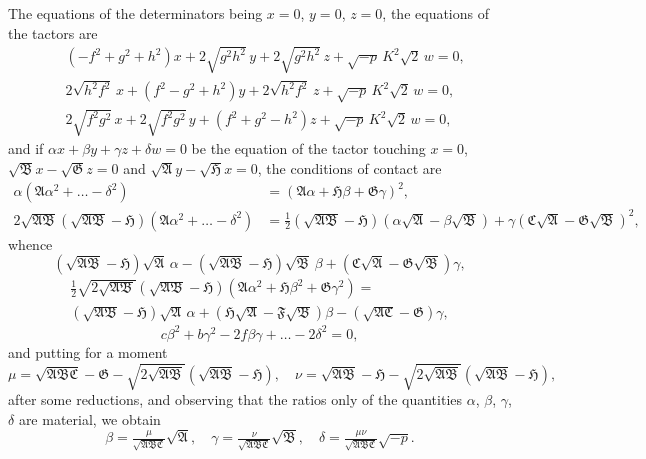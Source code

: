\documentclass[11pt,a4paper]{book}
\begin{document}
The equations of the determinators being $x=0$, $y=0$, $z=0$, the equations of the tactors are
\begin{align*}
&(-f^2+g^2+h^2)x + 2\sqrt{g^2h^2}\,y + 2\sqrt{g^2h^2}\,z + \sqrt{-p}\,K^2\sqrt{2}\,w = 0,\\
&2\sqrt{h^2f^2}\,x + (f^2-g^2+h^2)y + 2\sqrt{h^2f^2}\,z + \sqrt{-p}\,K^2\sqrt{2}\,w = 0,\\
&2\sqrt{f^2g^2}\,x + 2\sqrt{f^2g^2}\,y + (f^2+g^2-h^2)z + \sqrt{-p}\,K^2\sqrt{2}\,w = 0,
\end{align*}
and if $\alpha x+\beta y+\gamma z+\delta w=0$ be the equation of the tactor touching $x=0$, $\sqrt{\mathfrak{B}}x-\sqrt{\mathfrak{G}}z=0$ and $\sqrt{\mathfrak{A}}y-\sqrt{\mathfrak{H}}x=0$, the conditions of contact are
\begin{align*}
\alpha(\mathfrak{A}\alpha^2+\ldots-\delta^2) &= (\mathfrak{A}\alpha+\mathfrak{H}\beta+\mathfrak{G}\gamma)^2,\\
2\sqrt{\mathfrak{A}\mathfrak{B}}(\sqrt{\mathfrak{A}\mathfrak{B}}-\mathfrak{H})(\mathfrak{A}\alpha^2+\ldots-\delta^2) &= \tfrac{1}{2}(\sqrt{\mathfrak{A}\mathfrak{B}}-\mathfrak{H})(\alpha\sqrt{\mathfrak{A}}-\beta\sqrt{\mathfrak{B}})+\gamma(\mathfrak{C}\sqrt{\mathfrak{A}}-\mathfrak{G}\sqrt{\mathfrak{B}})^2,
\end{align*}
whence
\[
(\sqrt{\mathfrak{A}\mathfrak{B}}-\mathfrak{H})\sqrt{\mathfrak{A}}\,\alpha - (\sqrt{\mathfrak{A}\mathfrak{B}}-\mathfrak{H})\sqrt{\mathfrak{B}}\,\beta + (\mathfrak{C}\sqrt{\mathfrak{A}}-\mathfrak{G}\sqrt{\mathfrak{B}})\gamma,
\]
\begin{multline*}
\tfrac{1}{2}\sqrt{2\sqrt{\mathfrak{A}\mathfrak{B}}}(\sqrt{\mathfrak{A}\mathfrak{B}}-\mathfrak{H})(\mathfrak{A}\alpha^2+\mathfrak{H}\beta^2+\mathfrak{G}\gamma^2) =\\
(\sqrt{\mathfrak{A}\mathfrak{B}}-\mathfrak{H})\sqrt{\mathfrak{A}}\,\alpha + (\mathfrak{H}\sqrt{\mathfrak{A}}-\mathfrak{F}\sqrt{\mathfrak{B}})\beta - (\sqrt{\mathfrak{A}\mathfrak{C}}-\mathfrak{G})\gamma,
\end{multline*}
\[
c\beta^2+b\gamma^2-2f\beta\gamma+\ldots-2\delta^2=0,
\]
and putting for a moment
\[
\mu = \sqrt{\mathfrak{A}\mathfrak{B}\mathfrak{C}}-\mathfrak{G}-\sqrt{2\sqrt{\mathfrak{A}\mathfrak{B}}}(\sqrt{\mathfrak{A}\mathfrak{B}}-\mathfrak{H}), \quad \nu = \sqrt{\mathfrak{A}\mathfrak{B}}-\mathfrak{H}-\sqrt{2\sqrt{\mathfrak{A}\mathfrak{B}}}(\sqrt{\mathfrak{A}\mathfrak{B}}-\mathfrak{H}),
\]
after some reductions, and observing that the ratios only of the quantities $\alpha$, $\beta$, $\gamma$, $\delta$ are material, we obtain
\[
\beta = \tfrac{\mu}{\sqrt{\mathfrak{A}\mathfrak{B}\mathfrak{C}}}\sqrt{\mathfrak{A}}, \quad \gamma = \tfrac{\nu}{\sqrt{\mathfrak{A}\mathfrak{B}\mathfrak{C}}}\sqrt{\mathfrak{B}}, \quad \delta = \tfrac{\mu\nu}{\sqrt{\mathfrak{A}\mathfrak{B}\mathfrak{C}}}\sqrt{-p}.
\]
\end{document}
